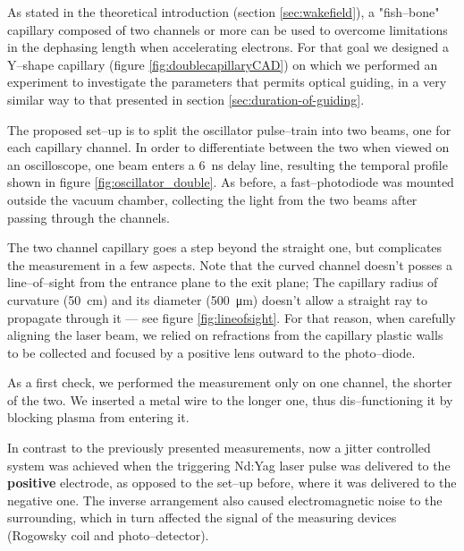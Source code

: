 \documentclass[../main.tex]{subfiles}
\begin{document}
As stated in the theoretical introduction (section \ref{sec:wakefield}), a "fish--bone" capillary composed of two channels or more can be used to overcome limitations in the dephasing length when accelerating electrons. For that goal we designed a Y--shape capillary (figure \ref{fig:doublecapillaryCAD}) on which we performed an experiment to investigate the parameters that permits optical guiding, in a very similar way to that presented in section \ref{sec:duration-of-guiding}.

The proposed set--up is to split the oscillator pulse--train into two beams, one for each capillary channel. In order to differentiate between the two when viewed on an oscilloscope, one beam enters a \SI{6}{\ns} delay line, resulting the temporal profile shown in figure \ref{fig:oscillator_double}. As before, a fast--photodiode was mounted outside the vacuum chamber, collecting the light from the two beams after passing through the channels.

The two channel capillary goes a step beyond the straight one, but complicates the measurement in a few aspects. Note that the curved channel doesn't posses a line--of--sight from the entrance plane to the exit plane; The capillary radius of curvature (\SI{50}{\cm}) and its diameter (\SI{500}{\um}) doesn't allow a straight ray to propagate through it --- see figure \ref{fig:lineofsight}. For that reason, when carefully aligning the laser beam, we relied on refractions from the capillary plastic walls to be collected and focused by a positive lens outward to the photo--diode.

As a first check, we performed the measurement only on one channel, the shorter of the two. We inserted a metal wire to the longer one, thus dis--functioning it by blocking plasma from entering it.

In contrast to the previously presented measurements, now a jitter controlled system was achieved when the triggering Nd:Yag laser pulse was delivered to the \textbf{positive} electrode, as opposed to the set--up before, where it was delivered to the negative one. The inverse arrangement also caused electromagnetic noise to the surrounding, which in turn affected the signal of the measuring devices (Rogowsky coil and photo--detector).
\end{document}
